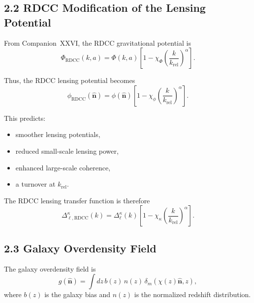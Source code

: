 \documentclass[11pt,a4paper]{article}
\begin{document}
\subsection*{2.2 RDCC Modification of the Lensing Potential}

From Companion~XXVI, the RDCC gravitational potential is
\begin{equation}
    \Phi_{\mathrm{RDCC}}(k,a)
    = \Phi(k,a)
      \left[
        1 - \chi_{\Phi}
        \left(\frac{k}{k_{\mathrm{rel}}}\right)^{\alpha}
      \right].
\end{equation}

Thus, the RDCC lensing potential becomes
\begin{equation}
    \phi_{\mathrm{RDCC}}(\hat{\mathbf{n}})
    = \phi(\hat{\mathbf{n}})
      \left[
        1 - \chi_{\phi}
        \left(\frac{k}{k_{\mathrm{rel}}}\right)^{\alpha}
      \right].
\end{equation}

This predicts:

\begin{itemize}
    \item smoother lensing potentials,
    \item reduced small-scale lensing power,
    \item enhanced large-scale coherence,
    \item a turnover at $k_{\mathrm{rel}}$.
\end{itemize}

The RDCC lensing transfer function is therefore
\begin{equation}
    \Delta_{\ell,\mathrm{RDCC}}^{\kappa}(k)
    = \Delta_{\ell}^{\kappa}(k)
      \left[
        1 - \chi_{\kappa}
        \left(\frac{k}{k_{\mathrm{rel}}}\right)^{\alpha}
      \right].
\end{equation}

\subsection*{2.3 Galaxy Overdensity Field}

The galaxy overdensity field is
\begin{equation}
    g(\hat{\mathbf{n}})
    = \int dz\,
      b(z)\,n(z)\,\delta_{m}(\chi(z)\hat{\mathbf{n}},z),
\end{equation}
where $b(z)$ is the galaxy bias and $n(z)$ is the normalized redshift distribution.
\end{document}
